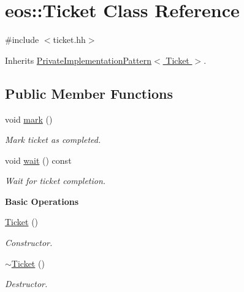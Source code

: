 \hypertarget{classeos_1_1Ticket}{
\section{eos::Ticket Class Reference}
\label{classeos_1_1Ticket}
}


{\ttfamily \#include $<$ticket.hh$>$}

Inherits \hyperlink{classeos_1_1PrivateImplementationPattern}{PrivateImplementationPattern$<$ Ticket $>$}.\subsection*{Public Member Functions}
\begin{DoxyCompactItemize}
\item 
void \hyperlink{classeos_1_1Ticket_a32a1041ca14a3a41b3f5ac9ea040b452}{mark} ()
\begin{DoxyCompactList}\small\item\em Mark ticket as completed. \item\end{DoxyCompactList}\item 
void \hyperlink{classeos_1_1Ticket_ab3dc3b4e907527f14d54a49269e8174d}{wait} () const 
\begin{DoxyCompactList}\small\item\em Wait for ticket completion. \item\end{DoxyCompactList}\end{DoxyCompactItemize}
\begin{Indent}{\bf Basic Operations}\par
{\em \label{_amgrpb5794bba6843c21acafdd6a4bfd776be}
 }\begin{DoxyCompactItemize}
\item 
\hyperlink{classeos_1_1Ticket_a3d191abdf730fab31d131aeaf3214878}{Ticket} ()
\begin{DoxyCompactList}\small\item\em Constructor. \item\end{DoxyCompactList}\item 
\hyperlink{classeos_1_1Ticket_a83323881ce189b387cb1358a2c8c63b0}{$\sim$Ticket} ()
\begin{DoxyCompactList}\small\item\em Destructor. \item\end{DoxyCompactList}\end{DoxyCompactItemize}
\end{Indent}
